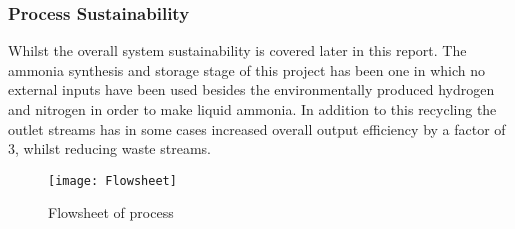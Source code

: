 \subsubsection{Process Sustainability}
Whilst the overall system sustainability is covered later in this report. The ammonia synthesis and storage stage of this project has been one in which no external inputs have been used besides the environmentally produced hydrogen and nitrogen in order to make liquid ammonia. In addition to this recycling the outlet streams has in some cases increased overall output efficiency by a factor of 3, whilst reducing waste streams.


	\begin{figure}[!htbp]
		\begin{center}

		\label{fig:flowsh}
		\texttt{[image: Flowsheet]}
		\caption{Flowsheet of process}
		\end{center}
\end{figure}

